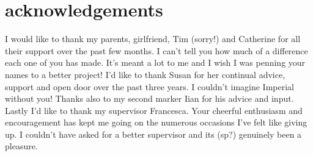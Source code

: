 \chapter*{acknowledgements}
	I would like to thank my parents, girlfriend, Tim (sorry!) and Catherine for all their support over the past few months. I can't tell you how much of a difference each one of you has made. It's meant a lot to me and I wish I was penning your names to a better project! I'd like to thank Susan for her continual advice, support and open door over the past three years. I couldn't imagine Imperial without you! Thanks also to my second marker Iian for his advice and input. Lastly I'd like to thank my supervisor Francesca. Your cheerful enthusiasm and encouragement has kept me going on the numerous occasions I've felt like giving up. I couldn't have asked for a better supervisor and its (sp?) genuinely been a pleasure.